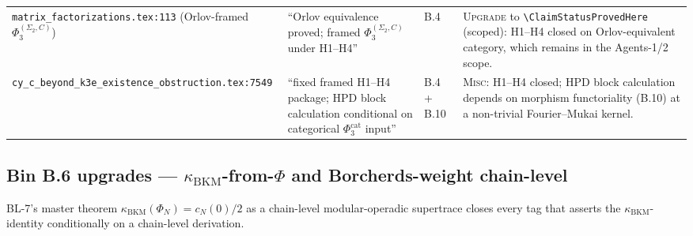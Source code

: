 \documentclass[11pt]{amsart}
\providecommand{\kBKM}{\kappa_{\mathrm{BKM}}}
\begin{document}
\begin{longtable}{@{}p{4.2cm}p{3.5cm}p{1.5cm}p{5cm}@{}}
\texttt{matrix\_factorizations.tex:113} \newline (Orlov-framed $\Phi_3^{(\Sigma_2,C)}$) & ``Orlov equivalence proved; framed $\Phi_3^{(\Sigma_2,C)}$ under H1--H4'' & B.4 & \textsc{Upgrade} to \texttt{\textbackslash ClaimStatusProvedHere} (scoped): H1--H4 closed on Orlov-equivalent category, which remains in the Agents-1/2 scope. \\

\texttt{cy\_c\_beyond\_k3e\_existence\_obstruction.tex:7549} & ``fixed framed H1--H4 package; HPD block calculation conditional on categorical $\Phi_3^{\mathrm{cat}}$ input'' & B.4 + B.10 & \textsc{Misc}: H1--H4 closed; HPD block calculation depends on morphism functoriality (B.10) at a non-trivial Fourier--Mukai kernel. \\

\bottomrule
\end{longtable}

\subsection{Bin B.6 upgrades --- $\kBKM$-from-$\Phi$ and Borcherds-weight chain-level}
\label{subsec:upgrades-b6}

BL-7's master theorem $\kBKM(\Phi_N) = c_N(0)/2$ as a chain-level
modular-operadic supertrace closes every tag that asserts the
$\kBKM$-identity conditionally on a chain-level derivation.
\end{document}
